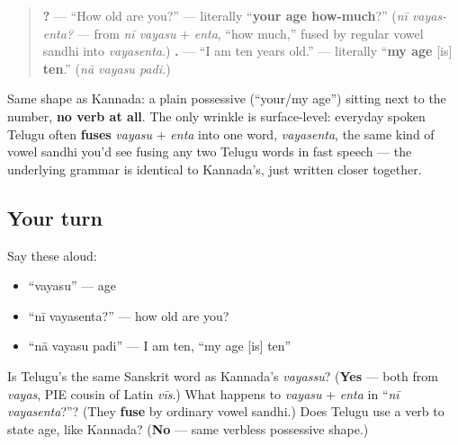 \begin{grammarlens}[title={Grammar Lens: fused by sandhi, still verbless}]
\begin{quote}
\textbf{ ?} — \textquotedblleft{}How old are you?\textquotedblright{} — literally \textquotedblleft{}\textbf{your age how-much}?\textquotedblright{} (\emph{nī vayas-enta?} — from \emph{nī vayasu} + \emph{enta}, \textquotedblleft{}how much,\textquotedblright{} fused by regular vowel sandhi into \emph{vayasenta}.) \textbf{  .} — \textquotedblleft{}I am ten years old.\textquotedblright{} — literally \textquotedblleft{}\textbf{my age} {[}is{]} \textbf{ten}.\textquotedblright{} (\emph{nā vayasu padi.})
\end{quote}

Same shape as Kannada: a plain possessive (\textquotedblleft{}your/my age\textquotedblright{}) sitting next to the number, \textbf{no verb at all}. The only wrinkle is surface-level: everyday spoken Telugu often \textbf{fuses} \emph{vayasu} + \emph{enta} into one word, \emph{vayasenta}, the same kind of vowel sandhi you'd see fusing any two Telugu words in fast speech — the underlying grammar is identical to Kannada's, just written closer together.
\end{grammarlens}

\subsection*{Your turn}
Say these aloud:

\begin{itemize}
\raggedright
  \item \textquotedblleft{}vayasu\textquotedblright{} — age
  \item \textquotedblleft{}nī vayasenta?\textquotedblright{} — how old are you?
  \item \textquotedblleft{}nā vayasu padi\textquotedblright{} — I am ten, \textquotedblleft{}my age {[}is{]} ten\textquotedblright{}
\end{itemize}

\begin{tcolorbox}[breakable,colback=teal!4,colframe=teal!35!black,title={Before you move on}]
Is Telugu's \textbf{} the same Sanskrit word as Kannada's \emph{vayassu}? (\textbf{Yes} — both from \emph{vayas}, PIE cousin of Latin \emph{vīs}.) What happens to \emph{vayasu} + \emph{enta} in \textquotedblleft{}\emph{nī vayasenta}?\textquotedblright{}? (They \textbf{fuse} by ordinary vowel sandhi.) Does Telugu use a verb to state age, like Kannada? (\textbf{No} — same verbless possessive shape.)
\end{tcolorbox}
